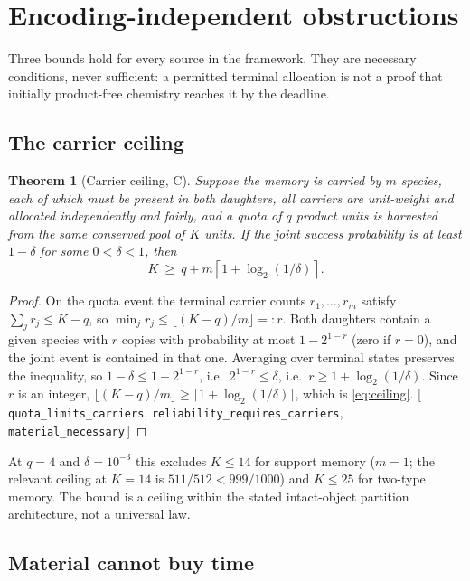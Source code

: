 \documentclass[11pt]{article}
\theoremstyle{plain}
\newtheorem{theorem}{Theorem}[section]
\theoremstyle{definition}
\theoremstyle{remark}
\newcommand{\leanref}[1]{{\normalfont\sffamily\footnotesize[\,#1\,]}}
\begin{document}
\section{Encoding-independent obstructions}\label{sec:obstructions}

Three bounds hold for every source in the framework. They are necessary
conditions, never sufficient: a permitted terminal allocation is not a proof
that initially product-free chemistry reaches it by the deadline.

\subsection{The carrier ceiling}

\begin{theorem}[Carrier ceiling, C]\label{thm:ceiling}
Suppose the memory is carried by $m$ species, each of which must be present in
both daughters, all carriers are unit-weight and allocated independently and
fairly, and a quota of $q$ product units is harvested from the same conserved
pool of $K$ units. If the joint success probability is at least $1-\delta$ for
some $0<\delta<1$, then
\begin{equation}\label{eq:ceiling}
K\ \ge\ q+m\left\lceil 1+\log_2(1/\delta)\right\rceil .
\end{equation}
\end{theorem}

\begin{proof}
On the quota event the terminal carrier counts $r_1,\dots,r_m$ satisfy
$\sum_j r_j\le K-q$, so $\min_j r_j\le\lfloor (K-q)/m\rfloor=:r$. Both
daughters contain a given species with $r$ copies with probability at most
$1-2^{1-r}$ (zero if $r=0$), and the joint event is contained in that one.
Averaging over terminal states preserves the inequality, so
$1-\delta\le1-2^{1-r}$, i.e.\ $2^{1-r}\le\delta$, i.e.\
$r\ge1+\log_2(1/\delta)$. Since $r$ is an integer,
$\lfloor(K-q)/m\rfloor\ge\lceil1+\log_2(1/\delta)\rceil$, which is
\eqref{eq:ceiling}. \leanref{\texttt{quota\_limits\_carriers},
\texttt{reliability\_requires\_carriers}, \texttt{material\_necessary}}
\end{proof}

At $q=4$ and $\delta=10^{-3}$ this excludes $K\le14$ for support memory
($m=1$; the relevant ceiling at $K=14$ is $511/512<999/1000$) and
$K\le25$ for two-type memory. The bound is a ceiling within the stated
intact-object partition architecture, not a universal law.

\subsection{Material cannot buy time}
\end{document}
